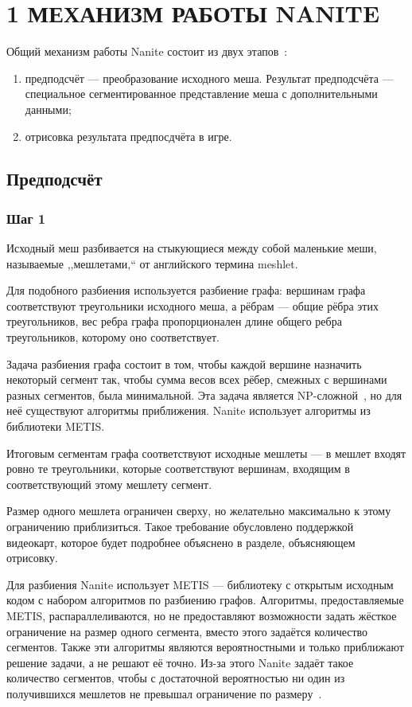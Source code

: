\clearpage
\section{1 МЕХАНИЗМ РАБОТЫ NANITE}
Общий механизм работы Nanite состоит из двух этапов~\cite{KarisNanite}:
\begin{enumerate}
    \item предподсчёт --- преобразование исходного меша.
    Результат предподсчёта --- специальное сегментированное представление меша с дополнительными данными;
    \item отрисовка результата предпосдчёта в игре.
\end{enumerate}

\subsection*{Предподсчёт}
\subsubsection*{Шаг 1}
Исходный меш разбивается на стыкующиеся между собой маленькие меши, называемые ,,мешлетами,`` от английского термина meshlet.

Для подобного разбиения используется разбиение графа: вершинам графа соответствуют треугольники исходного меша, а рёбрам --- общие рёбра этих треугольников, вес ребра графа пропорционален длине общего ребра треугольников, которому оно соответствует.

Задача разбиения графа состоит в том, чтобы каждой вершине назначить некоторый сегмент так, чтобы сумма весов всех рёбер, смежных с вершинами разных сегментов, была минимальной.
Эта задача является NP-сложной~\cite{GraphSegmentationNPHard}, но для неё существуют алгоритмы приближения.
Nanite использует алгоритмы из библиотеки METIS.

Итоговым сегментам графа соответствуют исходные мешлеты --- в мешлет входят ровно те треугольники, которые соответствуют вершинам, входящим в соответствующий этому мешлету сегмент.

Размер одного мешлета ограничен сверху, но желательно максимально к этому ограничению приблизиться.
Такое требование обусловлено поддержкой видеокарт, которое будет подробнее объяснено в разделе, объясняющем отрисовку.

Для разбиения Nanite использует METIS --- библиотеку с открытым исходным кодом с набором алгоритмов по разбиению графов.
Алгоритмы, предоставляемые METIS, распараллеливаются, но не предоставляют возможности задать жёсткое ограничение на размер одного сегмента, вместо этого задаётся количество сегментов.
Также эти алгоритмы являются вероятностными и только приближают решение задачи, а не решают её точно.
Из-за этого Nanite задаёт такое количество сегментов, чтобы с достаточной вероятностью ни один из получившихся мешлетов не превышал ограничение по размеру~\cite{NaniteSrcMETIS}.


